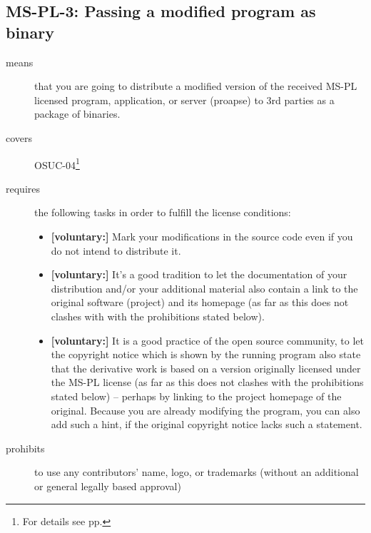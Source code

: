 \subsection{MS-PL-3: Passing a modified program as binary}

\begin{description}

\item[means] that you are going to distribute a modified version of the received
MS-PL licensed program, application, or server (proapse) to 3rd parties as a
package of binaries.

\item[covers] OSUC-04\footnote{For details see pp. \pageref{OSUC-04-DEF}}

\item[requires] the following tasks in order to fulfill the license conditions:
\begin{itemize}
  
  \item \textbf{[voluntary:]} Mark your modifications in the source code even if
  you do not intend to distribute it.
  
  \item \textbf{[voluntary:]} It's a good tradition to let the documentation of
  your distribution and/or your additional material also contain a link to the
  original software (project) and its homepage (as far as this does not clashes
  with with the prohibitions stated below).
  
  \item \textbf{[voluntary:]} It is a good practice of the open source
  community, to let the copyright notice which is shown by the running program
  also state that the derivative work is based on a version originally licensed
  under the MS-PL license (as far as this does not clashes with the prohibitions
  stated below) -- perhaps by linking to the project homepage of the original.
  Because you are already modifying the program, you can also add such a hint,
  if the original copyright notice lacks such a statement.
    
\end{itemize}

\item[prohibits] to use any contributors' name, logo, or trademarks (without an
additional or general legally based approval)

\end{description}



